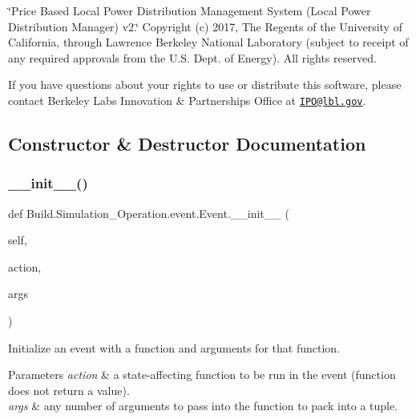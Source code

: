 \char`\"{}\+Price Based Local Power Distribution Management System (\+Local Power Distribution Manager) v2.\char`\"{} Copyright (c) 2017, The Regents of the University of California, through Lawrence Berkeley National Laboratory (subject to receipt of any required approvals from the U.\+S. Dept. of Energy). All rights reserved.

If you have questions about your rights to use or distribute this software, please contact Berkeley Lab\textquotesingle{}s Innovation \& Partnerships Office at \href{mailto:IPO@lbl.gov}{\tt I\+P\+O@lbl.\+gov}. 

\subsection{Constructor \& Destructor Documentation}
\mbox{\label{class_build_1_1_simulation___operation_1_1event_1_1_event_a9453491fff56e3d46eff942d308d4c87}} 
\subsubsection{\texorpdfstring{\+\_\+\+\_\+init\+\_\+\+\_\+()}{\_\_init\_\_()}}
{\footnotesize\ttfamily def Build.\+Simulation\+\_\+\+Operation.\+event.\+Event.\+\_\+\+\_\+init\+\_\+\+\_\+ (\begin{DoxyParamCaption}\item[{}]{self,  }\item[{}]{action,  }\item[{}]{args }\end{DoxyParamCaption})}



Initialize an event with a function and arguments for that function. 


\begin{DoxyParams}{Parameters}
{\em action} & a state-\/affecting function to be run in the event (function does not return a value). \\
\hline
{\em args} & any number of arguments to pass into the function to pack into a tuple. \\
\hline
\end{DoxyParams}


